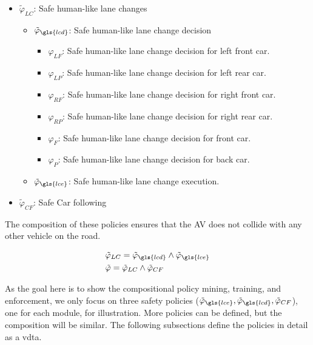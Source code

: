 \begin{itemize}
  \item $\tilde{\varphi}_{LC}$: Safe human-like lane changes
 \begin{itemize}
      \item $\tilde{\varphi}_{\gls{lcd}}$: Safe human-like lane change decision
 \begin{itemize}
        \item $\varphi_{LF}$: Safe human-like lane change decision for left front car.
        \item  $\varphi_{LP}$: Safe human-like lane change decision for left rear car.
        \item $\varphi_{RF}$: Safe human-like lane change decision for right front car.
        \item $\varphi_{RP}$: Safe human-like lane change decision for right rear car.
        \item $\varphi_{F}$: Safe human-like lane change decision for front car.
        \item $\varphi_{P}$: Safe human-like lane change decision for back car.
 \end{itemize}
      \item $\tilde{\varphi}_{\gls{lce}}$: Safe human-like lane change execution.
 \end{itemize}
  \item $\tilde{\varphi}_{CF}$: Safe Car following 
\end{itemize}


The composition of these policies ensures that the AV does not collide with any other vehicle on the road.

\begin{equation}
 \begin{aligned}
    & \tilde{\varphi}_{LC} = \tilde{\varphi}_{\gls{lcd}} \land \tilde{\varphi}_{\gls{lce}} \\
    & \tilde{\varphi} = \tilde{\varphi}_{LC} \land \tilde{\varphi}_{CF}
 \end{aligned}
\end{equation}

As the goal here is to show the compositional policy mining, training, and enforcement, we only focus on three safety policies ($\tilde{\varphi}_{\gls{lce}}, \tilde{\varphi}_{\gls{lcd}}, \tilde{\varphi}_{CF}$), one for each module, for illustration. More policies can be defined, but the composition will be similar. The following subsections define the policies in detail as a \gls{vdta}.


